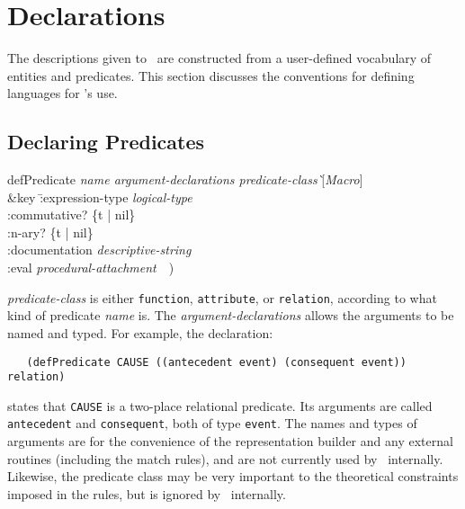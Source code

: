 \section{Declarations}

The descriptions given to \SME\ are constructed from a user-defined
vocabulary of entities and predicates. This section discusses the
conventions for defining languages for \SME's use.

\subsection{Declaring Predicates}

\begin{tt}
\begin{tabbing}
defPredicate \= {\it name argument-declarations predicate-class} \` [{\it Macro}] \\
             \> \&key \= :expression-type {\it logical-type}    \\
             \>      \> :commutative?  \{t | nil\}              \\
             \>      \> :n-ary?  \{t | nil\}                    \\
             \>      \> :documentation {\it descriptive-string} \\
             \>      \> :eval {\it procedural-attachment}\ \ )
\end{tabbing}
\end{tt}

\noindent
{\it predicate-class} is either {\tt function}, {\tt attribute}, or
{\tt relation}, according to what kind of predicate {\it name} is.
The {\it argument-declarations} allows the arguments to be named and
typed.  For example, the declaration:

\begin{verbatim}
   (defPredicate CAUSE ((antecedent event) (consequent event)) relation)
\end{verbatim}
states that {\tt CAUSE} is a two-place relational predicate.  Its arguments
are called {\tt antecedent} and {\tt consequent}, both of type {\tt event}.
The names and types of arguments are for the convenience of the
representation builder and any external routines (including the match rules),
and are not currently used by \SME\ internally.  Likewise, the predicate
class may be very important to the theoretical constraints imposed in the
rules, but is ignored by \SME\ internally.

